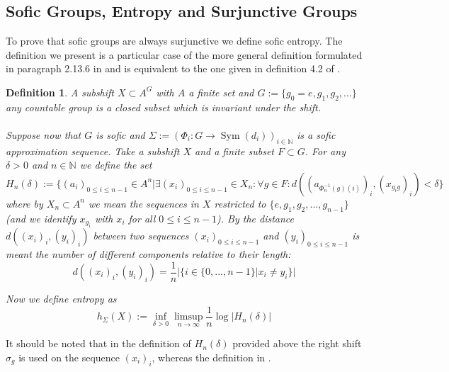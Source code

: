 \documentclass[titlepage, a4paper]{article}
\newcommand{\N}{\mathbb{N}}
\DeclareMathOperator{\sym}{Sym}
\newtheorem{definition}[theorem]{Definition}
\theoremstyle{remark}
\begin{document}
\subsection{Sofic Groups, Entropy and Surjunctive Groups}\label{ssec:sofic_surjunctive}

To prove that sofic groups are always surjunctive we define sofic entropy. The definition we present is a particular case of the more general definition formulated in paragraph 2.13.6 in \cite{capraro_lupini_2015} and is equivalent to the one given in definition 4.2 of \cite{kerr_li_2010}. 

\begin{definition}

A subshift $X \subset A^G$ with $A$ a finite set and $G := \{g_0 = e, g_1, g_2, ...\}$ any countable group is a closed subset which is invariant under the shift.\\
\\
Suppose now that $G$ is sofic and $\Sigma := (\Phi_i: G \to \sym(d_i))_{i \in \N}$ is a sofic approximation sequence. Take a subshift $X$ and a finite subset $F \subset G$. For any $\delta > 0$ and $n \in \N$ we define the set 
		\[
		H_n (\delta) := \{(a_i)_{0 \leq i \leq n-1} \in A^n | 
						\exists (x_i)_{0 \leq i \leq n-1} \in X_n : 
						\forall g \in F: d((a_{\Phi^{-1}_n(g)(i)})_i,(x_{ g_i g})_i) < \delta \}
		\]
		where by $X_n \subset A^n$ we mean the sequences in $X$ restricted to $\{e, g_1, g_2, ..., g_{n-1}\}$ (and we identify $x_{g_i}$ with $x_i$ for all $0 \leq i \leq n-1$). By the distance $d((x_i)_i, (y_i)_i)$ between two sequences $(x_i)_{0 \leq i \leq n-1}$ and $(y_i)_{0 \leq i \leq n-1}$ is meant the number of different components relative to their length:
		\[
		d((x_i)_i, (y_i)_i) = \frac{1}{n} |\{i \in \{0, ..., n-1\}|x_i \neq y_i\}|
		\]
				

		Now we define entropy as 
		\[
		h_\Sigma(X) := \inf_{\delta>0} \limsup_{n \to \infty} \frac{1}{n} \log |H_n(\delta)|
		\]
\end{definition}

It should be noted that in the definition of $H_n(\delta)$ provided above the right shift $\sigma_g$ is used on the sequence $(x_i)_i$, whereas the definition in \cite[paragraph 2.13.6]{capraro_lupini_2015}.\\
\end{document}
